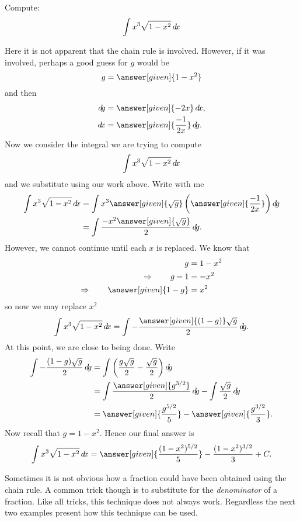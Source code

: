 \documentclass{ximera}
\begin{document}
\begin{example}
  Compute:
\[
\int x^3\sqrt{1-x^2}\mathop{}\!d\! x
\]
\begin{explanation}
Here it is not apparent that the chain rule is involved. However, if
it was involved, perhaps a good guess for $g$ would be
\[
g = \answer[given]{1-x^2}
\]
and then
\begin{align*}
  \d g &= \answer[given]{-2x} \d x, \\
  \d x &= \answer[given]{\frac{-1}{2x}} \d g.
\end{align*}
Now we consider the integral we are trying to compute
\[
\int x^3\sqrt{1-x^2}\mathop{}\!d\! x
\]
and we substitute using our work above. Write with me
\begin{align*}
  \int x^3\sqrt{1-x^2}\d x &= \int x^3 \answer[given]{\sqrt{g}} \left( \answer[given]{\frac{-1}{2x}} \right) \d g \\
  &= \int \frac{-x^2 \answer[given]{\sqrt{g}}}{2}\d g.
\end{align*}
However, we cannot continue until each $x$ is replaced. We know that
\begin{align*}
g &= 1-x^2 \\
\Rightarrow \qquad g -1 &= -x^2\\
\Rightarrow \qquad \answer[given]{1- g} &= x^2
\end{align*}
so now we may replace $x^2$
\[
\int x^3\sqrt{1-x^2}\d x = \int -\frac{\answer[given]{(1-g)} \sqrt{g}}{2}\d g.
\]
At this point, we are close to being done. Write
\begin{align*}
\int -\frac{(1-g)\sqrt{g}}{2}\d g &= \int \left(\frac{g\sqrt{g}}{2} - \frac{\sqrt{g}}{2}\right) \d g \\
&= \int \frac{\answer[given]{g^{3/2}}}{2} \d g - \int \frac{\sqrt{g}}{2} \d g \\
&= \answer[given]{\frac{g^{5/2}}{5}} - \answer[given]{\frac{g^{3/2}}{3}}.
\end{align*}
Now recall that $g = 1-x^2$. Hence our final answer is
\[
\int x^3\sqrt{1-x^2}\d x = \answer[given]{\frac{(1-x^2)^{5/2}}{5}} - \frac{(1-x^2)^{3/2}}{3}+C.
\]
\end{explanation}
\end{example}


Sometimes it is not obvious how a fraction could have been obtained
using the chain rule.  A common trick though is to substitute for the
\textit{denominator} of a fraction.  Like all tricks, this technique
does not always work. Regardless the next two examples present how
this technique can be used.
\end{document}

